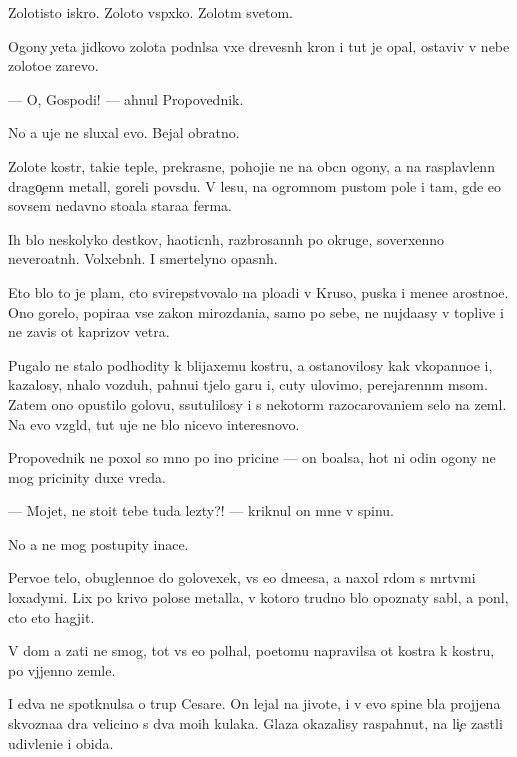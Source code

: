 \documentclass[10pt]{book}
\begin{document}
Zolotisto{\y} iskro{\y}. Zoloto{\y} vsp{\yi}xko{\y}. Zolot{\yi}m svetom.

Ogony {\c}veta jidkovo zolota podn{\ia}lsa v{\yi}xe drevesn{\yi}h kron i tut je opal, ostaviv v nebe zoloto{\y}e zarevo.

— O, Gospodi! — ahnul Propovednik.

No {\y}a uje ne sluxal {\y}evo. Bejal obratno.



Zolot{\yi}{\y}e kostr{\yi}, taki{\y}e tepl{\yi}{\y}e, prekrasn{\yi}{\y}e, pohoji{\y}e ne na ob{\yi}cn{\yi}{\y} ogony, a na rasplavlenn{\yi}{\y} drago{\c}enn{\yi}{\y} metall, goreli povs{\iu}du. V lesu, na ogromnom pustom pole i tam, gde {\y}e{\x}o sovsem nedavno sto{\y}ala stara{\y}a ferma.

Ih b{\yi}lo neskolyko des{\ia}tkov, haoticn{\yi}h, razbrosann{\yi}h po okruge, soverxenno nevero{\y}atn{\yi}h. Volxebn{\yi}h. I smertelyno opasn{\yi}h.

Eto b{\yi}lo to je plam{\ia}, cto svirepstvovalo na plo{\x}adi v Kruso, puska{\y} i mene{\y}e {\y}arostno{\y}e. Ono gorelo, popira{\y}a vse zakon{\yi} mirozdani{\y}a, samo po sebe, ne nujda{\y}asy v toplive i ne zavis{\ia} ot kaprizov vetra.

Pugalo ne stalo podhodity k blija{\y}xemu kostru, a ostanovilosy kak vkopanno{\y}e i, kazalosy, n{\iu}halo vozduh, pahnu{\x}i{\y} t{\ia}jelo{\y} gar{\y}u i, cuty ulovimo, perejarenn{\yi}m m{\ia}som. Zatem ono opustilo golovu, ssutulilosy i s nekotor{\yi}m razocarovani{\y}em selo na zeml{\iu}. Na {\y}evo vzgl{\ia}d, tut uje ne b{\yi}lo nicevo interesnovo.

Propovednik ne poxol so mno{\y} po ino{\y} pricine — on bo{\y}alsa, hot{\ia} ni odin ogony ne mog pricinity duxe vreda.

— Mojet, ne sto{\y}it tebe tuda lezty?! — kriknul on mne v spinu.

No {\y}a ne mog postupity inace.

Pervo{\y}e telo, obuglenno{\y}e do golovexek, vs{\e} {\y}e{\x}o d{\yi}m{\ia}{\x}e{\y}esa, {\y}a naxol r{\ia}dom s m{\e}rtv{\yi}mi loxadymi. Lix po krivo{\y} polose metalla, v kotoro{\y} trudno b{\yi}lo opoznaty sabl{\iu}, {\y}a pon{\ia}l, cto eto hagjit.

V dom {\y}a za{\y}ti ne smog, tot vs{\e} {\y}e{\x}o pol{\yi}hal, poetomu napravilsa ot kostra k kostru, po v{\yi}jjenno{\y} zemle.

I {\y}edva ne spotknulsa o trup Cesare. On lejal na jivote, i v {\y}evo spine b{\yi}la projjena skvozna{\y}a d{\yi}ra velicino{\y} s dva mo{\y}ih kulaka. Glaza okazalisy raspahnut{\yi}, na li{\c}e zast{\yi}li udivleni{\y}e i obida.
\end{document}
